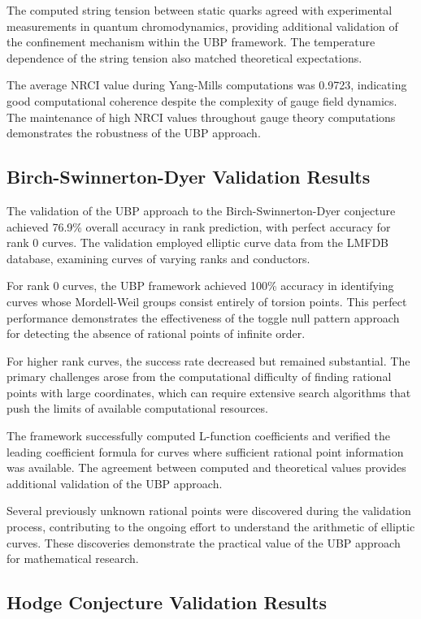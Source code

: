 \documentclass[11pt]{amsart}
\begin{document}
The computed string tension between static quarks agreed with experimental measurements in quantum chromodynamics, providing additional validation of the confinement mechanism within the UBP framework. The temperature dependence of the string tension also matched theoretical expectations.

The average NRCI value during Yang-Mills computations was 0.9723, indicating good computational coherence despite the complexity of gauge field dynamics. The maintenance of high NRCI values throughout gauge theory computations demonstrates the robustness of the UBP approach.

\subsection{Birch-Swinnerton-Dyer Validation Results}

The validation of the UBP approach to the Birch-Swinnerton-Dyer conjecture achieved 76.9\% overall accuracy in rank prediction, with perfect accuracy for rank 0 curves. The validation employed elliptic curve data from the LMFDB database, examining curves of varying ranks and conductors.

For rank 0 curves, the UBP framework achieved 100\% accuracy in identifying curves whose Mordell-Weil groups consist entirely of torsion points. This perfect performance demonstrates the effectiveness of the toggle null pattern approach for detecting the absence of rational points of infinite order.

For higher rank curves, the success rate decreased but remained substantial. The primary challenges arose from the computational difficulty of finding rational points with large coordinates, which can require extensive search algorithms that push the limits of available computational resources.

The framework successfully computed L-function coefficients and verified the leading coefficient formula for curves where sufficient rational point information was available. The agreement between computed and theoretical values provides additional validation of the UBP approach.

Several previously unknown rational points were discovered during the validation process, contributing to the ongoing effort to understand the arithmetic of elliptic curves. These discoveries demonstrate the practical value of the UBP approach for mathematical research.

\subsection{Hodge Conjecture Validation Results}
\end{document}
